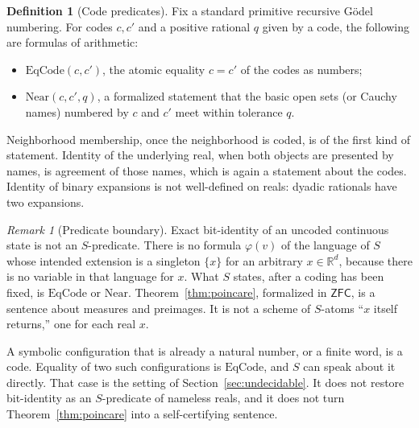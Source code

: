 \documentclass[11pt]{article}
\newcommand{\RR}{\mathbb{R}}
\newcommand{\ZFC}{\mathsf{ZFC}}
\theoremstyle{definition}
\newtheorem{definition}[theorem]{Definition}
\theoremstyle{remark}
\newtheorem{remark}[theorem]{Remark}
\begin{document}
\begin{definition}[Code predicates]
\label{def:codes}
Fix a standard primitive recursive G\"odel numbering.
For codes \(c,c'\) and a positive rational \(q\) given by a code, the following are formulas of arithmetic:
\begin{itemize}
\item \(\mathrm{EqCode}(c,c')\), the atomic equality \(c=c'\) of the codes as numbers;
\item \(\mathrm{Near}(c,c',q)\), a formalized statement that the basic open sets (or Cauchy names) numbered by \(c\) and \(c'\) meet within tolerance \(q\).
\end{itemize}
Neighborhood membership, once the neighborhood is coded, is of the first kind of statement.
Identity of the underlying real, when both objects are presented by names, is agreement of those names, which is again a statement about the codes.
Identity of binary expansions is not well-defined on reals: dyadic rationals have two expansions.
\end{definition}

\begin{remark}[Predicate boundary]
\label{rem:boundary}
Exact bit-identity of an uncoded continuous state is not an \(S\)-predicate.
There is no formula \(\varphi(v)\) of the language of \(S\) whose intended extension is a singleton \(\{x\}\) for an arbitrary \(x\in\RR^{d}\), because there is no variable in that language for \(x\).
What \(S\) states, after a coding has been fixed, is \(\mathrm{EqCode}\) or \(\mathrm{Near}\).
Theorem~\ref{thm:poincare}, formalized in \(\ZFC\), is a sentence about measures and preimages.
It is not a scheme of \(S\)-atoms ``\(x\) itself returns,'' one for each real \(x\).
\end{remark}

A symbolic configuration that is already a natural number, or a finite word, is a code.
Equality of two such configurations is \(\mathrm{EqCode}\), and \(S\) can speak about it directly.
That case is the setting of Section~\ref{sec:undecidable}.
It does not restore bit-identity as an \(S\)-predicate of nameless reals, and it does not turn Theorem~\ref{thm:poincare} into a self-certifying sentence.
\end{document}
